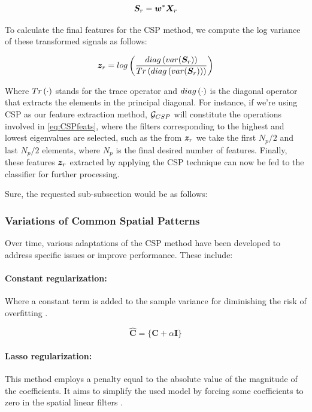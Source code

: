 \begin{equation}
\bm {S}_r = \bm {w}^* \bm {X}_r     
\end{equation}

To calculate the final features for the CSP method, we compute the log variance of these transformed signals as follows:

\begin{equation}\label{eq:CSPfeats}
\bm {z}_r = log \left( \frac{diag \left( var({\bm {S}}_{r}) \right)}{Tr \left( diag \left( var(\bm {S}_{r}) \right) \right)}  \right)  
\end{equation}

Where $Tr \left( \cdot \right)$ stands for the trace operator and $diag \left( \cdot \right)$ is the diagonal operator that extracts the elements in the principal diagonal. For instance, if we're using CSP as our feature extraction method, $\mathcal {G}_{CSP}$ will constitute the operations involved in \eqref{eq:CSPfeats}, where the filters corresponding to the highest and lowest eigenvalues are selected, such as the from $\bm {z}_r$ we take the first $N_p/2$ and last $N_p/2$ elements, where $N_p$ is the final desired number of features. Finally, these features $\bm {z}_r$ extracted by applying the CSP technique can now be fed to the classifier for further processing.

Sure, the requested sub-subsection would be as follows:

\subsubsection{Variations of Common Spatial Patterns}

Over time, various adaptations of the CSP method have been developed to address specific issues or improve performance. These include:

\paragraph{Constant regularization:} Where a constant term is added to the sample variance for diminishing the risk of overfitting \cite{park2017filter}.

\begin{equation}
    \hat{\mathbf{C}}=\{\mathbf{C}+\alpha \mathbf{I}\}
\end{equation}

\paragraph{Lasso regularization:} This method employs a penalty equal to the absolute value of the magnitude of the coefficients. It aims to simplify the used model by forcing some coefficients to zero in the spatial linear filters \cite{zhang2018new}.

